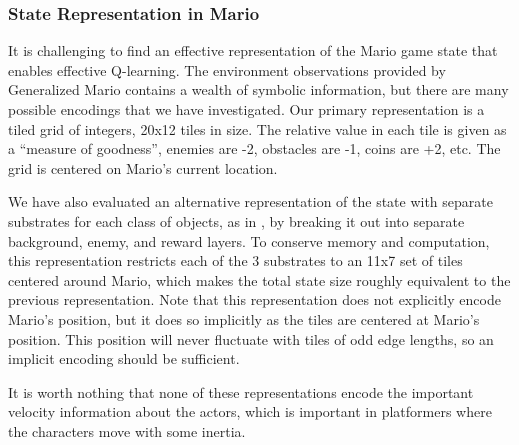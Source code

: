 \documentclass{article}
\begin{document}
\subsubsection{State Representation in Mario}
It is challenging to find an effective representation of the Mario game state that enables effective Q-learning. The environment observations provided by Generalized Mario contains a wealth of symbolic information, but there are many possible encodings that we have investigated. Our primary representation is a tiled grid of integers, 20x12 tiles in size. The relative value in each tile is given as a ``measure of goodness'', enemies are -2, obstacles are -1, coins are +2, etc. The grid is centered on Mario's current location. 

We have also evaluated an alternative representation of the state with separate substrates for each class of objects, as in \cite{Hauskneck13}, by breaking it out into separate background, enemy, and reward layers. To conserve memory and computation, this representation restricts each of the 3 substrates to an 11x7 set of tiles centered around Mario, which makes the total state size roughly equivalent to the previous representation. Note that this representation does not explicitly encode Mario's position, but it does so implicitly as the tiles are centered at Mario's position. This position will never fluctuate with tiles of odd edge lengths, so an implicit encoding should be sufficient.

It is worth nothing that none of these representations encode the important velocity information about the actors, which is important in platformers where the characters move with some inertia.
\end{document}
